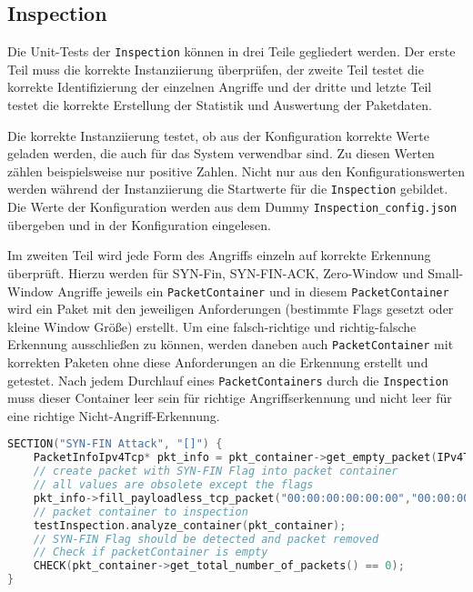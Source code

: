 \documentclass[../review_3.tex]{subfiles}
\begin{document}
\subsection{Inspection}
Die Unit-Tests der \texttt{Inspection} können in drei Teile gegliedert werden.
Der erste Teil muss die korrekte Instanziierung überprüfen, der zweite Teil testet die korrekte Identifizierung der einzelnen Angriffe und der dritte und letzte Teil testet die korrekte Erstellung der Statistik und Auswertung der Paketdaten.

Die korrekte Instanziierung testet, ob aus der Konfiguration korrekte Werte geladen werden, die auch für das System verwendbar sind. Zu diesen Werten zählen beispielsweise nur positive Zahlen. Nicht nur aus den Konfigurationswerten werden während der Instanziierung die Startwerte für die \texttt{Inspection} gebildet. Die Werte der Konfiguration werden aus dem Dummy \texttt{Inspection\_config.json} übergeben und in der Konfiguration eingelesen.

Im zweiten Teil wird jede Form des Angriffs einzeln auf korrekte Erkennung überprüft. Hierzu werden für SYN-Fin, SYN-FIN-ACK, Zero-Window und Small-Window Angriffe jeweils ein \texttt{PacketContainer} und in diesem \texttt{PacketContainer} wird ein Paket mit den jeweiligen Anforderungen (bestimmte Flags gesetzt oder kleine Window Größe) erstellt. Um eine falsch-richtige und richtig-falsche Erkennung ausschließen zu können, werden daneben auch \texttt{PacketContainer} mit korrekten Paketen ohne diese Anforderungen an die Erkennung erstellt und getestet. Nach jedem Durchlauf eines \texttt{PacketContainers} durch die \texttt{Inspection} muss dieser Container leer sein für richtige Angriffserkennung und nicht leer für eine richtige Nicht-Angriff-Erkennung.

\begin{lstlisting}[language=C++, caption={Test von SYN-FIN Angriffen in \texttt{Inspection\_test.cpp}}, label=synfininspection]
SECTION("SYN-FIN Attack", "[]") {
    PacketInfoIpv4Tcp* pkt_info = pkt_container->get_empty_packet(IPv4TCP);
    // create packet with SYN-FIN Flag into packet container
    // all values are obsolete except the flags 
    pkt_info->fill_payloadless_tcp_packet("00:00:00:00:00:00","00:00:00:00:00:00",0,0,0,0,0,0,0b00000011,0);
    // packet container to inspection
    testInspection.analyze_container(pkt_container);
    // SYN-FIN Flag should be detected and packet removed
    // Check if packetContainer is empty
    CHECK(pkt_container->get_total_number_of_packets() == 0);
}
\end{lstlisting}
\end{document}
